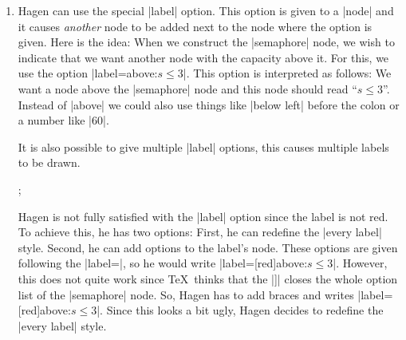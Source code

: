 \begin{enumerate}
    \item Hagen can use the special |label| option. This option is given to a
        |node| and it causes \emph{another} node to be added next to the node
        where the option is given. Here is the idea: When we construct the
        |semaphore| node, we wish to indicate that we want another node with
        the capacity above it. For this, we use the option
        |label=above:$s\le 3$|. This option is interpreted as follows: We want
        a node above the |semaphore| node and this node should read ``$s \le
        3$''. Instead of |above| we could also use things like |below left|
        before the colon or a number like |60|.
\begin{codeexample}[preamble={\usetikzlibrary{positioning}}]
\end{codeexample}
        It is also possible to give multiple |label| options, this causes
        multiple labels to be drawn.
\begin{codeexample}[]
\tikz
  ;
\end{codeexample}
        Hagen is not fully satisfied with the |label| option since the label
        is not red. To achieve this, he has two options: First, he can
        redefine the |every label| style. Second, he can add options to the
        label's node. These options are given following the |label=|, so he
        would write |label=[red]above:$s\le3$|. However, this does not quite
        work since \TeX\ thinks that the |]| closes the whole option list of
        the |semaphore| node. So, Hagen has to add braces and writes
        |label={[red]above:$s\le3$}|. Since this looks a bit ugly, Hagen
        decides to redefine the |every label| style.
\begin{codeexample}[preamble={\usetikzlibrary{positioning}}]
\end{codeexample}
\end{enumerate}


